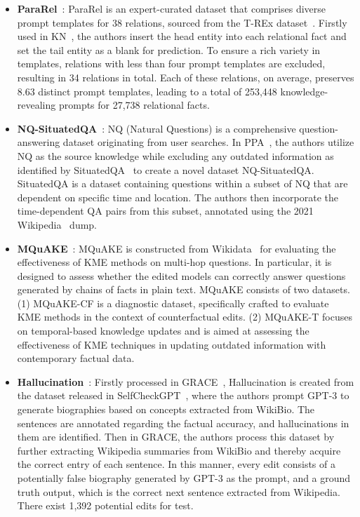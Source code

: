 \documentclass[acmsmall, screen]{acmart}
\begin{document}
\begin{itemize}[leftmargin=0.35cm]
\item \textbf{ParaRel}~\cite{elazar2021measuring}: ParaRel is an expert-curated dataset that comprises diverse prompt templates for 38 relations, sourced from the T-REx dataset~\cite{elsahar2018t}. Firstly used in KN~\cite{dai2022knowledge}, the authors insert the head entity into each relational fact and set the tail entity as a blank for prediction. To ensure a rich variety in templates,  relations with less than four prompt templates are excluded, resulting in 34 relations in total. Each of these relations, on average, preserves 8.63 distinct prompt templates, leading to a total of 253,448 knowledge-revealing prompts for 27,738 relational facts.

\item \textbf{NQ-SituatedQA}~\cite{kwiatkowski2019natural}: NQ (Natural Questions) is a comprehensive question-answering dataset originating from user searches. In PPA~\cite{lee2022plugandplay}, the authors utilize NQ as the source knowledge while excluding any outdated information as identified by SituatedQA~\cite{zhang2021situatedqa} to create a novel dataset NQ-SituatedQA. SituatedQA is a dataset containing questions within a subset of NQ that are dependent on specific time and location. The authors then incorporate the time-dependent QA pairs from this subset, annotated using the 2021 Wikipedia~\cite{vrandevcic2014wikidata} dump.


\item \textbf{MQuAKE}~\cite{MQuAKE}: MQuAKE is constructed from Wikidata~\cite{vrandevcic2014wikidata} for evaluating the effectiveness of KME methods on multi-hop questions. In particular, it is designed to assess whether the edited models can correctly answer questions generated by chains of facts in plain text. MQuAKE consists of two datasets. (1) MQuAKE-CF is a diagnostic dataset, specifically crafted to evaluate KME methods in the context of counterfactual edits. (2) MQuAKE-T focuses on temporal-based knowledge updates and is aimed at assessing the effectiveness of KME techniques in updating outdated information with contemporary factual data. 


\item\textbf{Hallucination}~\cite{hartvigsen2022aging}: Firstly processed in GRACE~\cite{hartvigsen2022aging}, Hallucination is created from the dataset released in SelfCheckGPT~\cite{manakul2023selfcheckgpt}, where the authors prompt GPT-3 to generate biographies based on concepts extracted from WikiBio. The sentences are annotated regarding the factual accuracy, and hallucinations in them are identified. Then in GRACE, the authors process this dataset by further extracting Wikipedia summaries from WikiBio and thereby acquire the correct entry of each sentence. In this manner, every edit consists of a potentially false biography generated by GPT-3 as the prompt, and a ground truth output, which is the correct next sentence extracted from Wikipedia.
There exist 1,392 potential edits for test.


\end{itemize}
\end{document}
